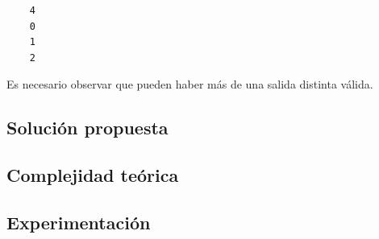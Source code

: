     \begin{verbatim}
    4
    0
    1
    2
    \end{verbatim}

    Es necesario observar que pueden haber más de una salida distinta válida.

    \subsection{Solución propuesta}

    \subsection{Complejidad teórica}

    \subsection{Experimentación}

